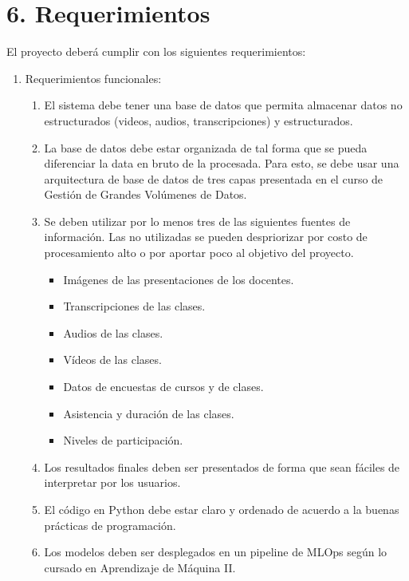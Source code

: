 \documentclass[
11pt, %
codirector, %
]{charter}
\begin{document}
\section{6. Requerimientos}
\label{sec:requerimientos}

El proyecto deberá cumplir con los siguientes requerimientos:

\begin{enumerate}
	\item Requerimientos funcionales:
		\begin{enumerate}
			\item El sistema debe tener una base de datos que permita almacenar datos no estructurados (videos, audios, transcripciones) y estructurados.
                \item La base de datos debe estar organizada de tal forma que se pueda diferenciar la data en bruto de la procesada. Para esto, se debe usar una arquitectura de base de datos de tres capas presentada en el curso de Gestión de Grandes Volúmenes de Datos.
			\item Se deben utilizar por lo menos tres de las siguientes fuentes de información. Las no utilizadas se pueden despriorizar por costo de procesamiento alto o por aportar poco al objetivo del proyecto.
                    \begin{itemize}
                        \item Imágenes de las presentaciones de los docentes.
                        \item Transcripciones de las clases.
                        \item Audios de las clases.
                        \item Vídeos de las clases.
                        \item Datos de encuestas de cursos y de clases.
                        \item Asistencia y duración de las clases.
                        \item Niveles de participación.
                    \end{itemize}
			\item Los resultados finales deben ser presentados de forma que sean fáciles de interpretar por los usuarios.
                \item El código en Python debe estar claro y ordenado de acuerdo a la buenas prácticas de programación.
                \item Los modelos deben ser desplegados en un pipeline de MLOps según lo cursado en Aprendizaje de Máquina II.

\end{enumerate}
\end{enumerate}
\end{document}
